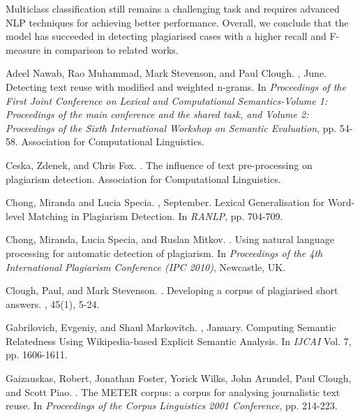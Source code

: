 \documentclass[11pt]{article}
\begin{document}
 Multiclass classification still remains a challenging task and requires advanced NLP techniques for achieving better performance. Overall, we conclude that the model has succeeded in detecting plagiarised cases with a higher recall and F-measure in comparison to related works.

%
%

\begin{thebibliography}{}
Adeel Nawab, Rao Muhammad, Mark Stevenson, and Paul Clough.
, June.
\newblock Detecting text reuse with modified and weighted n-grams.
\newblock In {\em Proceedings of the First Joint Conference on Lexical and Computational Semantics-Volume 1: Proceedings of the main conference and the shared task, and Volume 2: Proceedings of the Sixth International Workshop on Semantic Evaluation}, pp. 54-58. 
\newblock Association for Computational Linguistics.

Ceska, Zdenek, and Chris Fox.
.
\newblock The influence of text pre-processing on plagiarism detection.
\newblock Association for Computational Linguistics.

Chong, Miranda and Lucia Specia.
, September.
\newblock Lexical Generalisation for Word-level Matching in Plagiarism Detection.
\newblock In {\em RANLP}, pp. 704-709.

Chong, Miranda, Lucia Specia, and Ruslan Mitkov.
.
\newblock Using natural language processing for automatic detection of plagiarism.
\newblock In {\em Proceedings of the 4th International Plagiarism Conference (IPC 2010)}, Newcastle, UK.

Clough, Paul, and Mark Stevenson.
.
\newblock Developing a corpus of plagiarised short answers.
, 45(1), 5-24.

Gabrilovich, Evgeniy, and Shaul Markovitch.
, January.
\newblock Computing Semantic Relatedness Using Wikipedia-based Explicit Semantic Analysis.
\newblock In {\em IJCAI} Vol. 7, pp. 1606-1611.

Gaizauskas, Robert, Jonathan Foster, Yorick Wilks, John Arundel, Paul Clough, and Scott Piao.
.
\newblock The METER corpus: a corpus for analysing journalistic text reuse.
\newblock In {\em Proceedings of the Corpus Linguistics 2001 Conference}, pp. 214-223.


\end{thebibliography}
\end{document}
